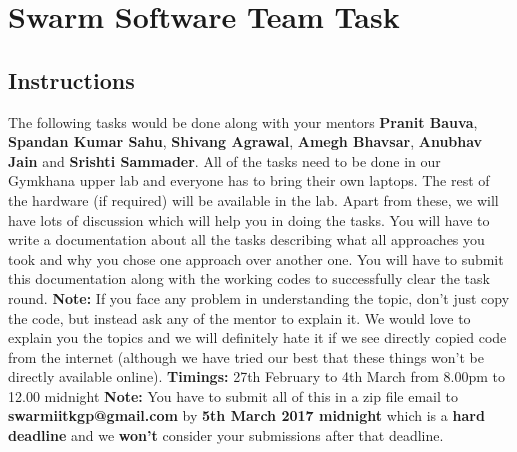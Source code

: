 \documentclass{article}
\begin{document}
\section*{Swarm Software Team Task}

\subsection*{Instructions} %
The following tasks would be done along with your mentors {\bf Pranit Bauva}, {\bf Spandan Kumar Sahu}, {\bf Shivang Agrawal}, {\bf Amegh Bhavsar}, {\bf Anubhav Jain} and {\bf Srishti Sammader}. All of the tasks need to be done in our Gymkhana upper lab and everyone has to bring their own laptops. The rest of the hardware (if required) will be available in the lab. Apart from these, we will have lots of discussion which will help you in doing the tasks. You will have to write a documentation about all the tasks describing what all approaches you took and why you chose one approach over another one. You will have to submit this documentation along with the working codes to successfully clear the task round. {\newline}{\newline}
{\bf Note:} If you face any problem in understanding the topic, don't just copy the code, but instead ask any of the mentor to explain it. We would love to explain you the topics and we will definitely hate it if we see directly copied code from the internet (although we have tried our best that these things won't be directly available online).
{\newline}{\newline}
{\bf Timings:} 27th February to 4th March from 8.00pm to 12.00 midnight
{\newline}{\newline}
{\bf Note:} You have to submit all of this in a zip file email to {\newline}{\bf  swarmiitkgp@gmail.com} by {\bf 5th March 2017 midnight} which is a {\bf hard deadline} and we {\bf won't} consider your submissions after that deadline.
\end{document}
